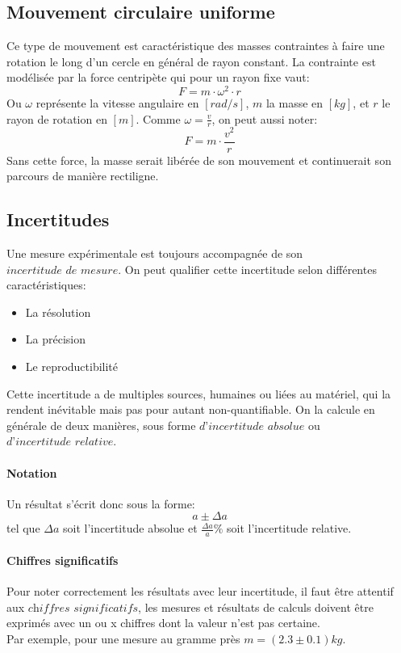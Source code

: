 \subsection{Mouvement circulaire uniforme}
Ce type de mouvement est caractéristique des masses contraintes à faire une rotation le long d'un cercle en général de rayon constant.
La contrainte est modélisée par la force centripète qui pour un rayon fixe vaut:
\begin{equation}
    \label{force}
    F=m\cdot \omega^2 \cdot r
\end{equation}
Ou $\omega$ représente la vitesse angulaire en $[rad/s]$, $m$ la masse en $[kg]$, et $r$ le rayon de rotation en $[m]$.
Comme $\omega=\frac{v}{r}$, on peut aussi noter:
\begin{equation}
    F=m\cdot\frac{v^2}{r}
\end{equation}
Sans cette force, la masse serait libérée de son mouvement et continuerait son parcours de manière rectiligne.

\subsection{Incertitudes}

Une mesure expérimentale est toujours accompagnée de son $\textit{incertitude de mesure}$. On peut qualifier cette incertitude selon différentes caractéristiques:
\begin{itemize}
\item La résolution
\item La précision
\item Le reproductibilité
\end{itemize}

Cette incertitude a de multiples sources, humaines ou liées au matériel, qui la rendent inévitable mais pas pour autant non-quantifiable.
On la calcule en générale de deux manières, sous forme $\textit{d'incertitude absolue}$ ou $\textit{d'incertitude relative}$.

\paragraph{Notation}
Un résultat s'écrit donc sous la forme: \[a\pm\Delta a\] tel que $\Delta a$ soit l'incertitude absolue et $\frac{\Delta a}{a} \%$ soit l'incertitude relative.

\paragraph{Chiffres significatifs}
Pour noter correctement les résultats avec leur incertitude, il faut être attentif aux $\textit{chiffres significatifs}$, les mesures et résultats de calculs doivent être exprimés avec un ou x chiffres dont la valeur n'est pas certaine.\\
Par exemple, pour une mesure au gramme près $m = (2.3\pm0.1)kg$.

